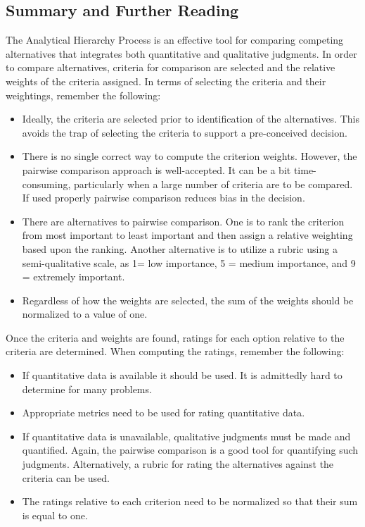 \subsection{\texorpdfstring{Summary and Further Reading
}{Summary and Further Reading }}\label{summary-and-further-reading}

The Analytical Hierarchy Process is an effective tool for comparing
competing alternatives that integrates both quantitative and qualitative
judgments. In order to compare alternatives, criteria for comparison are
selected and the relative weights of the criteria assigned. In terms of
selecting the criteria and their weightings, remember the following:

\begin{itemize}
\item
  Ideally, the criteria are selected prior to identification of the
  alternatives. This avoids the trap of selecting the criteria to
  support a pre-conceived decision.
\item
  There is no single correct way to compute the criterion weights.
  However, the pairwise comparison approach is well-accepted. It can be
  a bit time-consuming, particularly when a large number of criteria are
  to be compared. If used properly pairwise comparison reduces bias in
  the decision.
\item
  There are alternatives to pairwise comparison. One is to rank the
  criterion from most important to least important and then assign a
  relative weighting based upon the ranking. Another alternative is to
  utilize a rubric using a semi-qualitative scale, as 1= low importance,
  5 = medium importance, and 9 = extremely important.
\item
  Regardless of how the weights are selected, the sum of the weights
  should be normalized to a value of one.
\end{itemize}

Once the criteria and weights are found, ratings for each option
relative to the criteria are determined. When computing the ratings,
remember the following:

\begin{itemize}
\item
  If quantitative data is available it should be used. It is admittedly
  hard to determine for many problems.
\item
  Appropriate metrics need to be used for rating quantitative data.
\item
  If quantitative data is unavailable, qualitative judgments must be
  made and quantified. Again, the pairwise comparison is a good tool for
  quantifying such judgments. Alternatively, a rubric for rating the
  alternatives against the criteria can be used.
\item
  The ratings relative to each criterion need to be normalized so that
  their sum is equal to one.
\end{itemize}

